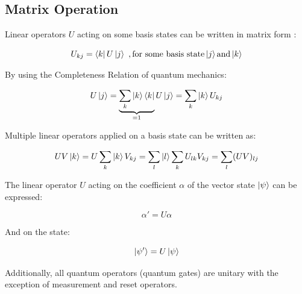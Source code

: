 \documentclass{article}
\begin{document}
\subsection{Matrix Operation}
\vspace{5mm}

\noindent
Linear operators $U$ acting on some basis states can be written in matrix form \cite{noauthor_lecture_nodate}:
\vspace{5mm}

\begin{equation}
U_{kj} = \bra{k}U\ket{j} \ , \text{for some basis state} \ket{j} \text{and} \ket{k} 
\end{equation}
\vspace{5mm}

\noindent
By using the Completeness Relation of quantum mechanics:
\vspace{5mm}

\begin{equation}
U\ket{j} = \underbrace{\sum\limits_k\ket{k}\bra{k}}_{ = 1} U\ket{j} = \sum\limits_k \ket{k} U_{kj}    
\end{equation}
\vspace{5mm}

\noindent
Multiple linear operators applied on a basis state can be written as:
\vspace{5mm}

\begin{equation}
UV\ket{k} = U\sum\limits_k \ket{k}V_{kj} = \sum\limits_l\ket{l} \sum\limits_k U_{lk} V_{kj} = \sum\limits_l(UV)_{lj}
\end{equation}
\vspace{5mm}

\noindent
The linear operator $U$ acting on the coefficient $\alpha$ of the vector state $\ket{\psi}$ can be expressed:
\vspace{5mm}

\begin{equation}
\alpha' = U\alpha
\end{equation}
\vspace{5mm}

\noindent
And on the state:
\vspace{5mm}

\begin{equation}
\ket{\psi'} = U\ket{\psi}
\end{equation}
\vspace{5mm}

\noindent
Additionally, all quantum operators (quantum gates) are unitary with the exception of measurement and reset operators. 
\vspace{5mm}
\end{document}
